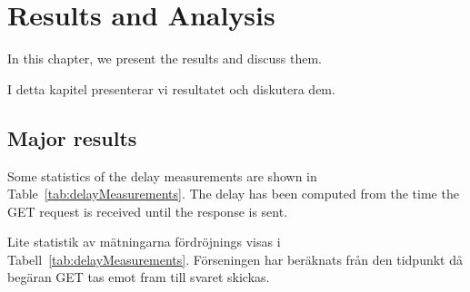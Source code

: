 \chapter{Results and Analysis}
\label{ch:resultsAndAnalysis}

In this chapter, we present the results and discuss them.

\begin{swedishnotes}
	I detta kapitel presenterar vi resultatet och diskutera dem.
\end{swedishnotes}

\section{Major results}

Some statistics of the delay measurements are shown in Table~\ref{tab:delayMeasurements}.
The delay has been computed from the time the GET request is received until the response is sent.

\begin{swedishnotes}
	Lite statistik av mätningarna fördröjnings visas i Tabell~\ref{tab:delayMeasurements}. Förseningen har beräknats från den tidpunkt då begäran GET tas emot fram till svaret skickas.
\end{swedishnotes}

